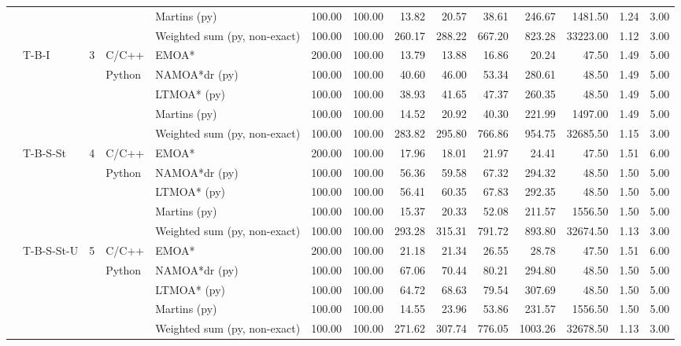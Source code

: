 \begin{table}
\begin{tabular}{lllllrrrrrrrrr}
 &  &  &  & Martins (py) & 100.00 & 100.00 & 13.82 & 20.57 & 38.61 & 246.67 & 1481.50 & 1.24 & 3.00 \\
 &  &  &  & Weighted sum (py, non-exact) & 100.00 & 100.00 & 260.17 & 288.22 & 667.20 & 823.28 & 33223.00 & 1.12 & 3.00 \\
\cline{2-14} \cline{3-14} \cline{4-14}
 & \multirow[t]{5}{*}{T-B-I} & \multirow[t]{5}{*}{3} & C/C++ & EMOA* & 200.00 & 100.00 & 13.79 & 13.88 & 16.86 & 20.24 & 47.50 & 1.49 & 5.00 \\
\cline{4-14}
 &  &  & \multirow[t]{4}{*}{Python} & NAMOA*dr (py) & 100.00 & 100.00 & 40.60 & 46.00 & 53.34 & 280.61 & 48.50 & 1.49 & 5.00 \\
 &  &  &  & LTMOA* (py) & 100.00 & 100.00 & 38.93 & 41.65 & 47.37 & 260.35 & 48.50 & 1.49 & 5.00 \\
 &  &  &  & Martins (py) & 100.00 & 100.00 & 14.52 & 20.92 & 40.30 & 221.99 & 1497.00 & 1.49 & 5.00 \\
 &  &  &  & Weighted sum (py, non-exact) & 100.00 & 100.00 & 283.82 & 295.80 & 766.86 & 954.75 & 32685.50 & 1.15 & 3.00 \\
\cline{2-14} \cline{3-14} \cline{4-14}
 & \multirow[t]{5}{*}{T-B-S-St} & \multirow[t]{5}{*}{4} & C/C++ & EMOA* & 200.00 & 100.00 & 17.96 & 18.01 & 21.97 & 24.41 & 47.50 & 1.51 & 6.00 \\
\cline{4-14}
 &  &  & \multirow[t]{4}{*}{Python} & NAMOA*dr (py) & 100.00 & 100.00 & 56.36 & 59.58 & 67.32 & 294.32 & 48.50 & 1.50 & 5.00 \\
 &  &  &  & LTMOA* (py) & 100.00 & 100.00 & 56.41 & 60.35 & 67.83 & 292.35 & 48.50 & 1.50 & 5.00 \\
 &  &  &  & Martins (py) & 100.00 & 100.00 & 15.37 & 20.33 & 52.08 & 211.57 & 1556.50 & 1.50 & 5.00 \\
 &  &  &  & Weighted sum (py, non-exact) & 100.00 & 100.00 & 293.28 & 315.31 & 791.72 & 893.80 & 32674.50 & 1.13 & 3.00 \\
\cline{2-14} \cline{3-14} \cline{4-14}
 & \multirow[t]{5}{*}{T-B-S-St-U} & \multirow[t]{5}{*}{5} & C/C++ & EMOA* & 200.00 & 100.00 & 21.18 & 21.34 & 26.55 & 28.78 & 47.50 & 1.51 & 6.00 \\
\cline{4-14}
 &  &  & \multirow[t]{4}{*}{Python} & NAMOA*dr (py) & 100.00 & 100.00 & 67.06 & 70.44 & 80.21 & 294.80 & 48.50 & 1.50 & 5.00 \\
 &  &  &  & LTMOA* (py) & 100.00 & 100.00 & 64.72 & 68.63 & 79.54 & 307.69 & 48.50 & 1.50 & 5.00 \\
 &  &  &  & Martins (py) & 100.00 & 100.00 & 14.55 & 23.96 & 53.86 & 231.57 & 1556.50 & 1.50 & 5.00 \\
 &  &  &  & Weighted sum (py, non-exact) & 100.00 & 100.00 & 271.62 & 307.74 & 776.05 & 1003.26 & 32678.50 & 1.13 & 3.00 \\
\cline{1-14} \cline{2-14} \cline{3-14} \cline{4-14}
\bottomrule
\end{tabular}
\end{table}
